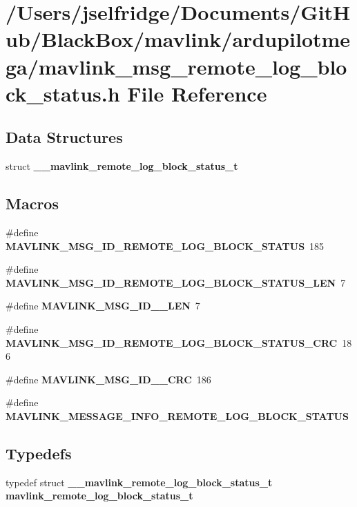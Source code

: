 \section{/\+Users/jselfridge/\+Documents/\+Git\+Hub/\+Black\+Box/mavlink/ardupilotmega/mavlink\+\_\+msg\+\_\+remote\+\_\+log\+\_\+block\+\_\+status.h File Reference}
\label{mavlink__msg__remote__log__block__status_8h}
\subsection*{Data Structures}
\begin{DoxyCompactItemize}
\item 
struct \textbf{ \+\_\+\+\_\+mavlink\+\_\+remote\+\_\+log\+\_\+block\+\_\+status\+\_\+t}
\end{DoxyCompactItemize}
\subsection*{Macros}
\begin{DoxyCompactItemize}
\item 
\#define \textbf{ M\+A\+V\+L\+I\+N\+K\+\_\+\+M\+S\+G\+\_\+\+I\+D\+\_\+\+R\+E\+M\+O\+T\+E\+\_\+\+L\+O\+G\+\_\+\+B\+L\+O\+C\+K\+\_\+\+S\+T\+A\+T\+US}~185
\item 
\#define \textbf{ M\+A\+V\+L\+I\+N\+K\+\_\+\+M\+S\+G\+\_\+\+I\+D\+\_\+\+R\+E\+M\+O\+T\+E\+\_\+\+L\+O\+G\+\_\+\+B\+L\+O\+C\+K\+\_\+\+S\+T\+A\+T\+U\+S\+\_\+\+L\+EN}~7
\item 
\#define \textbf{ M\+A\+V\+L\+I\+N\+K\+\_\+\+M\+S\+G\+\_\+\+I\+D\+\_\+\_\+\+L\+EN}~7
\item 
\#define \textbf{ M\+A\+V\+L\+I\+N\+K\+\_\+\+M\+S\+G\+\_\+\+I\+D\+\_\+\+R\+E\+M\+O\+T\+E\+\_\+\+L\+O\+G\+\_\+\+B\+L\+O\+C\+K\+\_\+\+S\+T\+A\+T\+U\+S\+\_\+\+C\+RC}~186
\item 
\#define \textbf{ M\+A\+V\+L\+I\+N\+K\+\_\+\+M\+S\+G\+\_\+\+I\+D\+\_\+\_\+\+C\+RC}~186
\item 
\#define \textbf{ M\+A\+V\+L\+I\+N\+K\+\_\+\+M\+E\+S\+S\+A\+G\+E\+\_\+\+I\+N\+F\+O\+\_\+\+R\+E\+M\+O\+T\+E\+\_\+\+L\+O\+G\+\_\+\+B\+L\+O\+C\+K\+\_\+\+S\+T\+A\+T\+US}
\end{DoxyCompactItemize}
\subsection*{Typedefs}
\begin{DoxyCompactItemize}
\item 
typedef struct \textbf{ \+\_\+\+\_\+mavlink\+\_\+remote\+\_\+log\+\_\+block\+\_\+status\+\_\+t} \textbf{ mavlink\+\_\+remote\+\_\+log\+\_\+block\+\_\+status\+\_\+t}
\end{DoxyCompactItemize}



